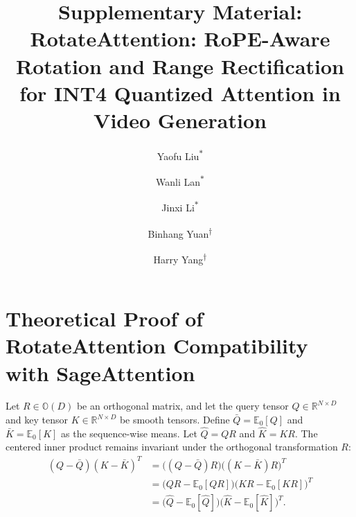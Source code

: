 \documentclass[runningheads]{llncs}
\begin{document}
\title{Supplementary Material: RotateAttention: RoPE-Aware Rotation and Range Rectification for INT4 Quantized Attention in Video Generation} 




\newcommand{\equalcontrib}{\textsuperscript{\(\ast\)}}
\newcommand{\corr}{\textsuperscript{\(\dagger\)}}

\author{
Yaofu Liu\equalcontrib \and
Wanli Lan\equalcontrib \and
Jinxi Li\equalcontrib \and
Binhang Yuan\corr \and
Harry Yang\corr
}



\maketitle

\begingroup
\renewcommand\thefootnote{\(\ast\)}
\renewcommand\thefootnote{\(\dagger\)}
\endgroup



\section{Theoretical Proof of RotateAttention Compatibility with SageAttention}

\begin{theorem}
\label{thm:orthogonal_attention}
Let $R \in \mathbb{O}(D)$ be an orthogonal matrix, and let the query tensor $Q \in \mathbb{R}^{N \times D}$ and key tensor $K \in \mathbb{R}^{N \times D}$ be smooth tensors. Define $\bar{Q} = \mathbb{E}_0[Q]$ and $\bar{K} = \mathbb{E}_0[K]$ as the sequence-wise means. Let $\hat{Q}=QR$ and $\hat{K}=KR$. The centered inner product remains invariant under the orthogonal transformation $R$:
\begin{align}
(Q - \bar{Q}) (K - \bar{K})^T 
&= \bigl((Q - \bar{Q})R\bigr) \bigl((K - \bar{K})R\bigr)^T \nonumber \\
&= \bigl(QR - \mathbb{E}_0[QR]\bigr) \bigl(KR - \mathbb{E}_0[KR]\bigr)^T \\
&=\bigl(\hat{Q} - \mathbb{E}_0[\hat{Q}]\bigr) \bigl(\hat{K} - \mathbb{E}_0[\hat{K}]\bigr)^T.
\end{align}
\end{theorem}
\end{document}
